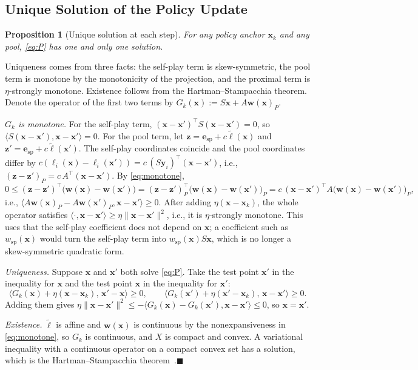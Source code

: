\documentclass{article}
\theoremstyle{plain}
\newtheorem{proposition}[theorem]{Proposition}
\theoremstyle{remark}
\newcommand{\bx}{{\bm{x}}}
\newcommand{\by}{{\bm{y}}}
\newcommand{\bw}{{\bm{w}}}
\newcommand{\bz}{{\bm{z}}}
\newcommand{\be}{{\bm{e}}}
\newcommand{\bell}{{\bm{\ell}}}
\newcommand{\aug}{\tilde{\bell}}
\newcommand{\esp}{\be_{\mathrm{sp}}}
\newcommand{\wsp}{w_{\mathrm{sp}}}
\begin{document}
\subsection{Unique Solution of the Policy Update}
\label{app:unique}

\begin{proposition}[Unique solution at each step]
\label{prop:unique}
For any policy anchor $\bx_k$ and any pool, \eqref{eq:P} has one and only one solution.
\end{proposition}
Uniqueness comes from three facts: the self-play term is skew-symmetric, the pool term is monotone by the monotonicity of the projection, and the proximal term is $\eta$-strongly monotone. Existence follows from the Hartman--Stampacchia theorem. Denote the operator of the first two terms by $G_k(\bx):=S\bx+A\bw(\bx)_P$.

\textit{$G_k$ is monotone.} For the self-play term, $(\bx-\bx')^\top S(\bx-\bx')=0$, so $\langle S(\bx-\bx'),\bx-\bx'\rangle=0$. For the pool term, let $\bz=\esp+c\aug(\bx)$ and $\bz'=\esp+c\aug(\bx')$. The self-play coordinates coincide and the pool coordinates differ by $c(\ell_i(\bx)-\ell_i(\bx'))=c\,(S\by_i)^\top(\bx-\bx')$, i.e., $(\bz-\bz')_P=c\,A^\top(\bx-\bx')$. By \eqref{eq:monotone},
\[
0\le(\bz-\bz')^\top\big(\bw(\bx)-\bw(\bx')\big)=(\bz-\bz')_P^\top\big(\bw(\bx)-\bw(\bx')\big)_P=c\,(\bx-\bx')^\top A\big(\bw(\bx)-\bw(\bx')\big)_P ,
\]
i.e., $\langle A\bw(\bx)_P-A\bw(\bx')_P,\bx-\bx'\rangle\ge0$. After adding $\eta(\bx-\bx_k)$, the whole operator satisfies $\langle\cdot,\bx-\bx'\rangle\ge\eta\|\bx-\bx'\|^2$, i.e., it is $\eta$-strongly monotone. This uses that the self-play coefficient does not depend on $\bx$; a coefficient such as $\wsp(\bx)$ would turn the self-play term into $\wsp(\bx)S\bx$, which is no longer a skew-symmetric quadratic form.

\textit{Uniqueness.} Suppose $\bx$ and $\bx'$ both solve \eqref{eq:P}. Take the test point $\bx'$ in the inequality for $\bx$ and the test point $\bx$ in the inequality for $\bx'$:
\[
\langle G_k(\bx)+\eta(\bx-\bx_k),\,\bx'-\bx\rangle\ge0,\qquad\langle G_k(\bx')+\eta(\bx'-\bx_k),\,\bx-\bx'\rangle\ge0 .
\]
Adding them gives $\eta\|\bx-\bx'\|^2\le-\langle G_k(\bx)-G_k(\bx'),\bx-\bx'\rangle\le0$, so $\bx=\bx'$.

\textit{Existence.} $\aug$ is affine and $\bw(\bx)$ is continuous by the nonexpansiveness in \eqref{eq:monotone}, so $G_k$ is continuous, and $X$ is compact and convex. A variational inequality with a continuous operator on a compact convex set has a solution, which is the Hartman--Stampacchia theorem~\citep{hartman1966,facchinei2003vi}.\hfill$\blacksquare$
\end{document}

